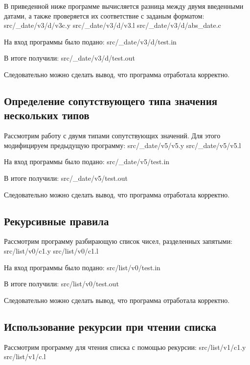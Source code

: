     В приведенной ниже программе вычисляется разница между двумя введенными датами,
    а также проверяется их соответствие с заданым форматом:
     {src/_date/v3/d/v3c.y}
     {src/_date/v3/d/v3.l}
     {src/_date/v3/d/abs_date.c}

    На вход программы было подано:
     {src/_date/v3/d/test.in}

    В итоге получили:
     {src/_date/v3/d/test.out}

    Следовательно можно сделать вывод, что программа отработала корректно.

\subsection{Определение сопутствующего типа значения нескольких типов}

    Рассмотрим работу с двумя типами сопутствующих значений.
    Для этого модифицируем предыдущую программу:
     {src/_date/v5/v5.y}
     {src/_date/v5/v5.l}

    На вход программы было подано:
     {src/_date/v5/test.in}

    В итоге получили:
     {src/_date/v5/test.out}

    Следовательно можно сделать вывод, что программа отработала корректно.


\subsection{Рекурсивные правила}

    Рассмотрим программу разбирающую список чисел, разделенных запятыми:
     {src/list/v0/c1.y}
     {src/list/v0/c1.l}

    На вход программы было подано:
     {src/list/v0/test.in}

    В итоге получили:
     {src/list/v0/test.out}

    Следовательно можно сделать вывод, что программа отработала корректно.


\subsection{Использование рекурсии при чтении списка}

    Рассмотрим программу для чтения списка с помощью рекурсии:
     {src/list/v1/c1.y}
     {src/list/v1/c.l}

